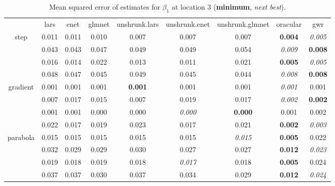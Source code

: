 \documentclass[authoryear, review, 11pt]{elsarticle}
\begin{document}
		\begin{table}[ht]
		\begin{center}
		\begin{tabular}{ccccccccc}
		  & lars & enet & glmnet & unshrunk.lars & unshrunk.enet & unshrunk.glmnet & oracular & gwr \\ 
		  \cline{2-9}
		  \multirow{4}{*}{step} & 0.011 & 0.011 & 0.010 & 0.007 & 0.007 & 0.007 & \textbf{0.004} & \emph{0.005} \\ 
		  & 0.043 & 0.043 & 0.047 & 0.049 & 0.049 & 0.054 & \emph{0.009} & \textbf{0.008} \\ 
		  & 0.016 & 0.014 & 0.022 & 0.013 & 0.011 & 0.021 & \textbf{0.005} & \emph{0.005} \\ 
		  & 0.048 & 0.047 & 0.045 & 0.049 & 0.045 & 0.044 & \emph{0.008} & \textbf{0.008} \\ 
		  \cline{2-9}
		  \multirow{4}{*}{gradient} & 0.001 & 0.001 & 0.001 & \textbf{0.001} & 0.001 & 0.001 & \emph{0.001} & 0.001 \\ 
		  & 0.007 & 0.017 & 0.015 & 0.007 & 0.019 & 0.017 & \emph{0.002} & \textbf{0.002} \\ 
		  & 0.001 & 0.001 & 0.000 & 0.000 & \emph{0.000} & \textbf{0.000} & 0.001 & 0.002 \\ 
		  & 0.022 & 0.017 & 0.019 & 0.023 & 0.017 & 0.021 & \textbf{0.002} & \emph{0.003} \\ 
		  \cline{2-9}
		  \multirow{4}{*}{parabola} & 0.015 & 0.015 & 0.015 & 0.015 & 0.015 & \emph{0.015} & \textbf{0.005} & 0.022 \\ 
		  & 0.032 & 0.029 & 0.029 & 0.030 & 0.027 & 0.027 & \textbf{0.012} & \emph{0.023} \\ 
		  & 0.019 & 0.018 & 0.019 & 0.018 & \emph{0.017} & 0.018 & \textbf{0.005} & 0.024 \\ 
		  & 0.037 & 0.037 & 0.030 & 0.037 & 0.034 & 0.029 & \textbf{0.012} & \emph{0.024} \\ 
		  \end{tabular}
		\caption{Mean squared error of estimates for $\beta_1$ at location 3 (\textbf{minimum}, \emph{next best}).\label{table:loc3-X1-MSEX}}
		\end{center}
		\end{table}
		
\end{document}
